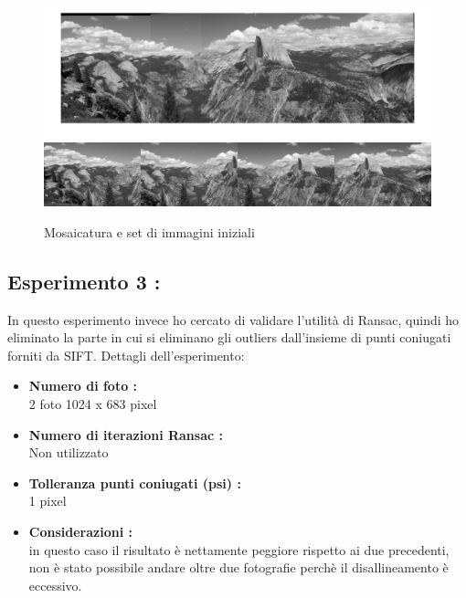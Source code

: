 \documentclass[11pt, oneside]{article}   	%
\begin{document}
\begin{figure}[H]
\includegraphics[width=\textwidth]{montagna_psi_5.jpg}
\includegraphics[width=\textwidth]{foto_mosaico_montagna2.png}

\caption{Mosaicatura e set di immagini iniziali}
\end{figure}


\subsection{Esperimento 3 :}
In questo esperimento invece  ho cercato di validare l'utilità di Ransac, quindi ho eliminato la parte in cui si eliminano gli outliers dall'insieme di punti coniugati forniti da SIFT.
Dettagli dell'esperimento:
\begin{itemize}
	\item \textbf{Numero di foto :} \\
	2 foto 1024 x 683 pixel
	\item \textbf{Numero di iterazioni Ransac : } \\
	Non utilizzato
	\item \textbf{Tolleranza punti coniugati (psi) :}\\
        1 pixel
        \item \textbf{Considerazioni : }\\
        in questo caso il risultato è nettamente peggiore rispetto ai due precedenti, non è stato possibile andare oltre due fotografie perchè il disallineamento è eccessivo.        
\end{itemize}
\end{document}
